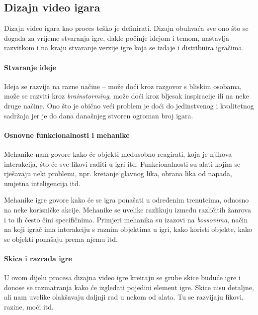 \documentclass[a4paper,10pt]{article}
\begin{document}
\subsection{Dizajn video igara}

Dizajn video igara kao proces teško je definirati. Dizajn obuhvaća sve ono što
se događa za vrijeme stvaranja igre, dakle počinje idejom i temom, nastavlja
razvitkom i na kraju stvaranje verzije igre koja se izdaje i distribuira
igračima.

\paragraph{Stvaranje ideje}

Ideja se razvija na razne načine -- može doći kroz razgovor s bliskim osobama,
može se razviti kroz \textit{brainstorming}, može doći kroz bljesak
inspiracije ili na neke druge načine. Ono što je obično veći problem je doći do
jedinstvenog i kvalitetnog sadržaja jer je do dana današnjeg stvoren ogroman
broj igara.

\paragraph{Osnovne funkcionalnosti i mehanike}

Mehanike nam govore kako će objekti međusobno
reagirati, koja je njihova interakcija, što će sve likovi raditi u igri itd.
Funkcionalnosti su alati kojim se rješavaju neki problemi, npr. kretanje
glavnog lika, obrana lika od napada, umjetna inteligencija itd.

Mehanike igre govore kako će se igra ponašati u određenim trenutcima, odnosno
na neke korisničke akcije.  Mehanike se uvelike razlikuju između različitih
žanrova i to ih često čini specifičnima. Primjeri mehanika su izazovi na
\textit{bossovima}, način na koji igrač ima interakciju s raznim objektima u
igri, kako koristi objekte, kako se objekti ponašaju prema njemu itd.

\paragraph{Skica i razrada igre}

U ovom dijelu procesa dizajna video igre kreiraju se grube skice buduće igre i
donose se razmatranja kako će izgledati pojedini element igre. Skice nisu
detaljne, ali nam uvelike olakšavaju daljnji rad u nekom od alata. Tu se
razvijaju likovi, razine, moći itd.
\end{document}
